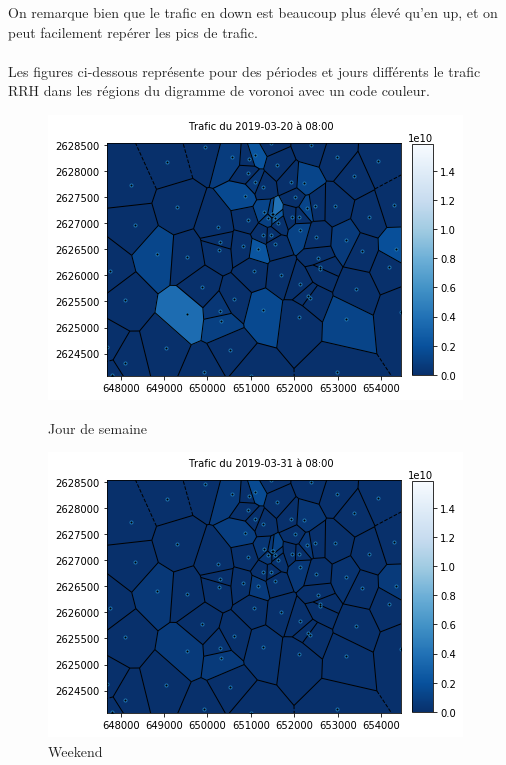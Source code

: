 \documentclass{report}
\begin{document}
On remarque bien que le trafic en down est beaucoup plus élevé qu'en up, et on peut facilement repérer les pics de trafic.\\
\\
Les figures ci-dessous représente pour des périodes et jours différents le trafic RRH dans les régions du digramme de voronoi avec un code couleur.
\begin{figure}[!htb]
   \begin{minipage}{0.4\textwidth}
     \centering
     \includegraphics[scale=0.55]{images/8_20.png}
     \caption{Jour de semaine}\label{Fig:Data1}
   \end{minipage}\hfill
   \begin{minipage}{0.4\textwidth}
     \centering
     \includegraphics[scale=0.55]{images/8_31.png}
     \caption{Weekend}\label{Fig:Data2}
   \end{minipage}
\end{figure} 
\end{document}
